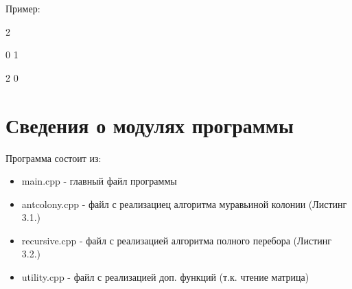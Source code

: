 \documentclass[12pt]{report}
\begin{document}
	Пример:
	
		2
		
		0 1
		
		2 0
	
	\section{Сведения о модулях программы}
	Программа состоит из:
	\begin{itemize}
		\item main.cpp - главный файл программы
		\item antcolony.cpp - файл с реализациец алгоритма муравьиной колонии (Листинг 3.1.)
		\item recursive.cpp - файл с реализацией алгоритма полного перебора (Листинг 3.2.)
		\item utility.cpp - файл с реализацией доп. функций (т.к. чтение матрица)
	\end{itemize}
\end{document}
